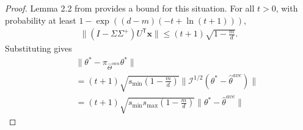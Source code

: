 \documentclass[twoside]{article}
\newtheorem{theorem}{Theorem}
\newcommand{\smin}{s_\text{min}}
\newcommand{\smax}{s_\text{max}}
\newcommand{\W}{{\hat \Theta^{\textit{owa}}}}
\newcommand{\E}{\mathbb{E}}
\newcommand{\x}{\mathbf{x}}
\newcommand{\w}{\theta}
\newcommand{\wave}{\hat\w^{ave}}
\newcommand{\wmle}{\hat\w^{mle}}
\newcommand{\wstar}{{\w^{*}}}
\newcommand{\tbias}{t_{\text{\textit{bias}}}}
\newcommand{\I}{\mathcal I}
\newcommand{\trans}[1]{\ensuremath{{#1}^{\mathsf{T}}}}
\newcommand{\ltwo}[1]{{\lVert {#1} \rVert}}
\newcommand{\lzero}[1]{{\lVert {#1} \rVert}_0}
\newcommand{\proj}[1]{\pi_{{#1}}}
\newcommand{\ignore}[1]{}
\begin{document}
\begin{proof}
Lemma 2.2 from \cite{dasgupta2003elementary} provides a bound for this situation.
For all $t>0$, with probability at least $1-\exp((d-m)(-t+\ln (t+1)))$,
\begin{align}
\ltwo{(I-\Sigma\Sigma^+)\trans U \x} \le (t+1) \sqrt{1-\frac{m}{d}}
.
\end{align}
Substituting gives
\begin{align}
~~~~~&\!\!\!\!\!\!\!\!\!\!\!\ltwo{\wstar-\proj\W\wstar}
\nonumber
\\
&=
(t+1)\sqrt{\smin\left(1-\frac{m}{d}\right)}\ltwo{\I^{1/2}(\wstar - \wave)}
\\
&=
(t+1)\sqrt{\smin\smax\left(1-\frac{m}{d}\right)}\ltwo{\wstar - \wave}
\end{align}

\ignore{
\begin{theorem}
Assume Condition 1 holds.
Let $t>0$.
Then we have that with probability at least $(1-\exp(-t))^2$,
\begin{equation}
\ltwo{\wstar-\proj\W\wstar}
\le
b_t\sqrt{\left(1-\frac{m}{d}\right)}
+
\sqrt\frac{v_{t}}{nm}
\end{equation}
where
\begin{equation}
b_t = \frac{\lambda_{\min}}{\lambda_{\max}}\ltwo{\wstar-\E\wmle_i}\sqrt{t + 1}
\end{equation}
$\lambda_{\min}$ and $\lambda_{\max}$ are the minimum and maximum eigenvalues of $\I^{-1}_{\wave}$,
and $v_t$ is defined as in Theorem \ref{thm:wave}.
\end{theorem}

This proof follows the same form as the proof for Theorem \ref{thm:wave}.
We first decompose the error into a bias and variance component;
then we bound each component separately.

}
\end{proof}
\end{document}
